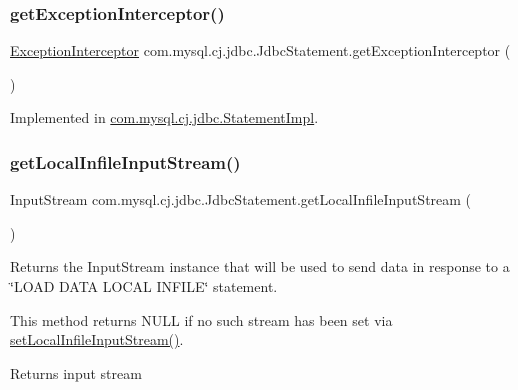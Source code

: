 \subsubsection{\texorpdfstring{get\+Exception\+Interceptor()}{getExceptionInterceptor()}}
{\footnotesize\ttfamily \mbox{\hyperlink{interfacecom_1_1mysql_1_1cj_1_1exceptions_1_1_exception_interceptor}{Exception\+Interceptor}} com.\+mysql.\+cj.\+jdbc.\+Jdbc\+Statement.\+get\+Exception\+Interceptor (\begin{DoxyParamCaption}{ }\end{DoxyParamCaption})}



Implemented in \mbox{\hyperlink{classcom_1_1mysql_1_1cj_1_1jdbc_1_1_statement_impl_a8c7aeabcfab5a1dcac5bf2fec0accaab}{com.\+mysql.\+cj.\+jdbc.\+Statement\+Impl}}.

\mbox{\label{interfacecom_1_1mysql_1_1cj_1_1jdbc_1_1_jdbc_statement_a1f5ddb4f3f7ad5c677a27d5350568eac}} 
\subsubsection{\texorpdfstring{get\+Local\+Infile\+Input\+Stream()}{getLocalInfileInputStream()}}
{\footnotesize\ttfamily Input\+Stream com.\+mysql.\+cj.\+jdbc.\+Jdbc\+Statement.\+get\+Local\+Infile\+Input\+Stream (\begin{DoxyParamCaption}{ }\end{DoxyParamCaption})}

Returns the Input\+Stream instance that will be used to send data in response to a \char`\"{}\+L\+O\+A\+D D\+A\+T\+A L\+O\+C\+A\+L I\+N\+F\+I\+L\+E\char`\"{} statement.

This method returns N\+U\+LL if no such stream has been set via \mbox{\hyperlink{interfacecom_1_1mysql_1_1cj_1_1jdbc_1_1_jdbc_statement_a89093285d02aa790bb07c7afab7c4140}{set\+Local\+Infile\+Input\+Stream()}}.

\begin{DoxyReturn}{Returns}
input stream 
\end{DoxyReturn}


